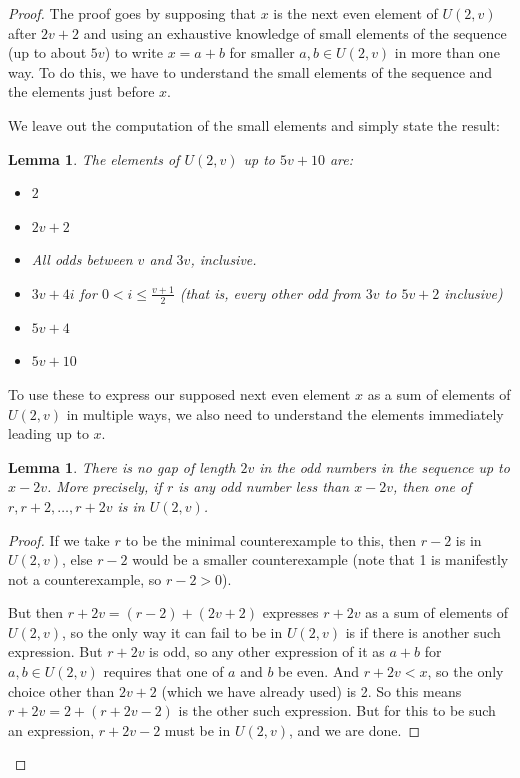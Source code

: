 \documentclass{report}
\newtheorem{lemma}[theorem]{Lemma}
\theoremstyle{remark}
\numberwithin{equation}{section}
\begin{document}
\begin{proof}
  The proof goes by supposing that $x$ is the next even element of
  $U(2,v)$ after $2v+2$ and using an exhaustive knowledge of small
  elements of the sequence (up to about $5v$) to write $x = a+b$ for
  smaller $a, b \in U(2,v)$ in more than one way.  To do this, we have
  to understand the small elements of the sequence and the elements
  just before $x$.  

  We leave out the computation of the small elements and simply state
  the result: 

  \begin{lemma}
    The elements of $U(2,v)$ up to $5v+10$ are: 

    \begin{itemize}
      \item $2$
      \item $2v+2$
      \item All odds between $v$ and $3v$, inclusive.
      \item $3v+4i$ for $0 < i \leq \frac{v+1}{2}$ (that is, every
        other odd from $3v$ to $5v+2$ inclusive)
      \item $5v+4$
      \item $5v+10$
    \end{itemize}
  \end{lemma}

  To use these to express our supposed next even element $x$ as a sum
  of elements of $U(2,v)$ in multiple ways, we also need to understand
  the elements immediately leading up to $x$.  

  \begin{lemma}
    There is no gap of length $2v$ in the odd numbers in the sequence
    up to $x-2v$.  More precisely, if $r$ is any odd number less than
    $x-2v$, then one of $r, r+2, \ldots, r+2v$ is in $U(2,v)$.  
  \end{lemma}
  \begin{proof}
    If we take $r$ to be the minimal counterexample to this, then $r-2$
    is in $U(2,v)$, else $r-2$ would be a smaller counterexample (note
    that 1 is manifestly not a counterexample, so $r-2 > 0$).  

    But then $r+2v = (r-2)+(2v+2)$ expresses $r+2v$ as a sum of
    elements of $U(2,v)$, so the only way it can fail to be in
    $U(2,v)$ is if there is another such expression.  But $r+2v$ is
    odd, so any other expression of it as $a+b$ for $a, b \in U(2,v)$
    requires that one of $a$ and $b$ be even.  And $r+2v < x$, so the
    only choice other than $2v+2$ (which we have already used) is 2.
    So this means $r+2v = 2+(r+2v-2)$ is the other such expression.
    But for this to be such an expression, $r+2v-2$ must be in
    $U(2,v)$, and we are done.
  \end{proof}


\end{proof}
\end{document}
